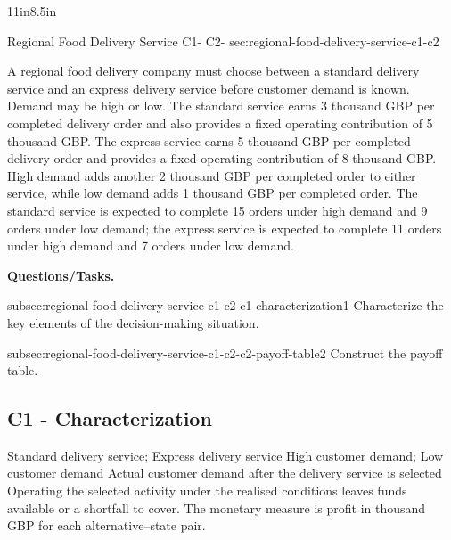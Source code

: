 {\begin{CalculationLandscape}{11in}{8.5in}
			
			\begingroup\renewcommand{\CalculationStateCount}{2}
\endgroup
\end{CalculationLandscape}

			
			\vspace{-5mm}
		}
	
		\sectionScored
	{Regional Food Delivery Service}
	{C1- \hspace{2mm} C2-}
	{sec:regional-food-delivery-service-c1-c2}
	{
		A regional food delivery company must choose between a standard delivery service and an express delivery service before customer demand is known. Demand may be high or low. The standard service earns 3 thousand GBP per completed delivery order and also provides a fixed operating contribution of 5 thousand GBP. The express service earns 5 thousand GBP per completed delivery order and provides a fixed operating contribution of 8 thousand GBP. High demand adds another 2 thousand GBP per completed order to either service, while low demand adds 1 thousand GBP per completed order. The standard service is expected to complete 15 orders under high demand and 9 orders under low demand; the express service is expected to complete 11 orders under high demand and 7 orders under low demand.
		
		\textbf{Questions/Tasks.}
		\begin{enumerate}
			\CriterionTask
			{subsec:regional-food-delivery-service-c1-c2-c1-characterization}{1}
			{Characterize the key elements of the decision-making situation. }
			
			\CriterionTask
			{subsec:regional-food-delivery-service-c1-c2-c2-payoff-table}{2}
			{Construct the payoff table. }
		\end{enumerate}
		
		\label{subsec:regional-food-delivery-service-c1-c2-c1-characterization}
		\subsection*{C1 - Characterization }
		
		\DecisionElementsTable
{Standard delivery service; Express delivery service}
{High customer demand; Low customer demand}
{Actual customer demand after the delivery service is selected}
{Operating the selected activity under the realised conditions leaves funds available or a shortfall to cover. The monetary measure is profit in thousand GBP for each alternative--state pair.}

}
